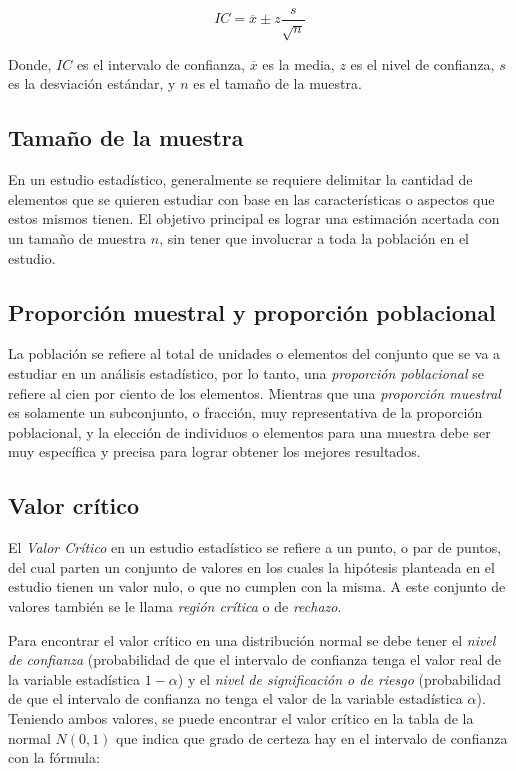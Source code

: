 \documentclass[a4paper, 12pt]{article}
\begin{document}
\begin{equation}
    IC=\overline{x}\pm z\frac{s}{\sqrt{n}}
\end{equation}

Donde, $IC$ es el intervalo de confianza, $\overline{x}$ es la media, $z$ es el nivel de confianza, $s$ es la desviación estándar, y $n$ es el tamaño de la muestra.

\subsection{Tamaño de la muestra}
En un estudio estadístico, generalmente se requiere delimitar la cantidad de elementos que se quieren estudiar con base en las características o aspectos que estos mismos tienen. El objetivo principal es lograr una estimación acertada con un tamaño de muestra $n$, sin tener que involucrar a toda la población en el estudio.

\subsection{Proporción muestral y proporción poblacional}
La población se refiere al total de unidades o elementos del conjunto que se va a estudiar en un análisis estadístico, por lo tanto, una \emph{proporción poblacional} se refiere al cien por ciento de los elementos. Mientras que una \emph{proporción muestral} es solamente un subconjunto, o fracción, muy representativa de la proporción poblacional, y la elección de individuos o elementos para una muestra debe ser muy específica y precisa para lograr obtener los mejores resultados.

\subsection{Valor crítico}
El \emph{Valor Crítico} en un estudio estadístico se refiere a un punto, o par de puntos, del cual parten un conjunto de valores en los cuales la hipótesis planteada en el estudio tienen un valor nulo, o que no cumplen con la misma. A este conjunto de valores también se le llama \emph{región crítica} o de \emph{rechazo}.

Para encontrar el valor crítico en una distribución normal se debe tener el \emph{nivel de confianza} (probabilidad de que el intervalo de confianza tenga el valor real de la variable estadística $1 - \alpha$) y el \emph{nivel de significación o de riesgo} (probabilidad de que el intervalo de confianza no tenga el valor de la variable estadística $\alpha$). Teniendo ambos valores, se puede encontrar el valor crítico en la tabla de la normal $N(0,1)$ que indica que grado de certeza hay en el intervalo de confianza con la fórmula:
\end{document}

